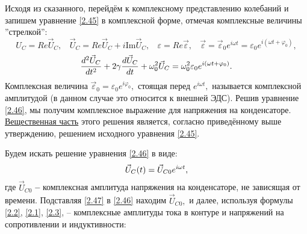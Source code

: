 Исходя из сказанного, перейдём к комплексному представлению колебаний и запишем уравнение \eqref{2.45} в комплексной форме, отмечая комплексные величины ''стрелкой'':
$$
U_C=Re\vec U_C,~~~~\vec U_C=Re\vec U_C+i\text{Im}\vec U_C,~~~~\varepsilon=Re\vec \varepsilon,~~~~\vec \varepsilon=\vec \varepsilon_0e^{i\omega t}=\varepsilon_0e^{i(\omega t+\varphi_0)},
$$
\begin{equation}\eqmark{2.46}
\dfrac{d^2\vec U_C}{dt^2}+2\gamma\dfrac{d\vec U_C}{dt}+\omega_0^2\vec U_C=\omega_0^2\varepsilon_0e^{i(\omega t+\varphi_0)}.
\end{equation}
Комплексная величина $\vec \varepsilon_0=\varepsilon_0e^{i\varphi_0},$ стоящая перед $e^{i\omega t},$ называется \textsf{комплексной амплитудой} (в данном случае это относится к внешней ЭДС). Решив уравнение \eqref{2.46}, мы получим комплексное выражение для напряжения на конденсаторе. \underline{Вещественная часть} этого решения является, согласно приведённому выше утверждению, решением исходного уравнения \eqref{2.45}.

Будем искать решение уравнения \eqref{2.46} в виде:
\begin{equation}\eqmark{2.47}
\vec U_C(t)=\vec U_{C0}e^{i\omega t},
\end{equation}
где $\vec U_{C0}$ \textbf{--} комплексная амплитуда напряжения на конденсаторе, не зависящая от времени. Подставляя \eqref{2.47} в \eqref{2.46} находим $\vec U_{C0},$ и далее, используя формулы \eqref{2.2}, \eqref{2.1}, \eqref{2.3}, \textsf{--} комплексные амплитуды тока в контуре и напряжений на сопротивлении и индуктивности:

